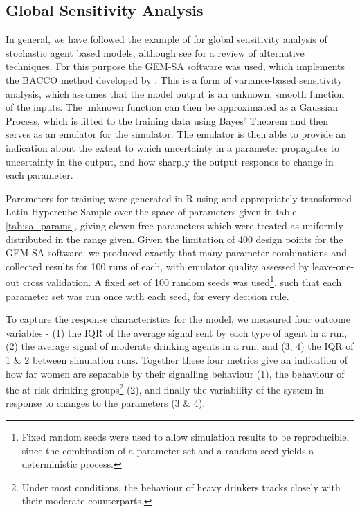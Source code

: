 \subsection{Global Sensitivity Analysis}
\label{sub:sensitivity}

In general, we have followed the example of \cite{Bijak2013b} for global sensitivity analysis of stochastic agent based models, although see \citet{Thiele2014} for a review of alternative techniques. For this purpose the \ac{GEM-SA} software \citep{Kennedy} was used, which implements the \ac{BACCO} method developed by \citeauthor{Oakley2004} \citep{Oakley2002,Oakley2004,Dorresteijn2010}. This is a form of variance-based sensitivity analysis, which assumes that the model output is an unknown, smooth function of the inputs. The unknown function can then be approximated as a Gaussian Process, which is fitted to the training data using Bayes' Theorem and then serves as an emulator for the simulator. The emulator is then able to provide an indication about the extent to which uncertainty in a parameter propagates to uncertainty in the output, and how sharply the output responds to change in each parameter.

\begin{comment}

Justification for doing SA, point out the wide variety of places this gets used. Talk about uncertainty, briefly raise model discrepancy.

\end{comment}

Parameters for training were generated in R \citep{RTeam2014} using and appropriately transformed Latin Hypercube Sample \citep{Carnell2012} over the space of parameters given in table \ref{tab:sa_params}, giving eleven free parameters which were treated as uniformly distributed in the range given.  Given the limitation of 400 design points for the \ac{GEM-SA} software, we produced exactly that many parameter combinations and collected results for 100 runs of each, with emulator quality assessed by leave-one-out cross validation. A fixed set of 100 random seeds was used\footnote{Fixed random seeds were used to allow simulation results to be reproducible, since the combination of a parameter set and a random seed yields a deterministic process.}, such that each parameter set was run once with each seed, for every decision rule.

To capture the response characteristics for the model, we measured four outcome variables - (1) the \ac{IQR} of the average signal sent by each type of agent in a run, (2) the average signal of moderate drinking agents in a run, and (3, 4) the \ac{IQR} of 1 \& 2 between simulation runs. Together these four metrics give an indication of how far women are separable by their signalling behaviour (1), the behaviour of the at risk drinking groups\footnote{Under most conditions, the behaviour of heavy drinkers tracks closely with their moderate counterparts.} (2), and finally the variability of the system in response to changes to the parameters (3 \& 4).

